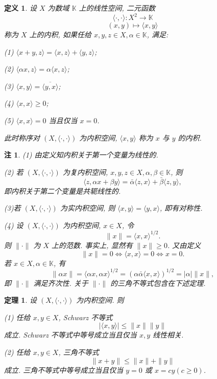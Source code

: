 \documentclass[openany]{ctexbook}
\theoremstyle{kaiti}
\newtheorem{definition}{定义}[section]
\newtheorem{theorem}{定理}[section]
\theoremstyle{normal}
\newtheorem{remark}{注}[section]
\begin{document}
\begin{definition}
设 $X$ 为数域 $\mathbb{K}$ 上的线性空间, 二元函数
$$
\langle\cdot, \cdot\rangle: X^2 \rightarrow \mathbb{K}
$$
$$
(x, y) \mapsto\langle x, y\rangle
$$
称为 $X$ 上的内积, 如果任给 $x, y, z \in X, \alpha \in \mathbb{K}$, 满足:

(1) $\langle x+y, z\rangle=\langle x, z\rangle+\langle y, z\rangle$;

(2) $\langle\alpha x, z\rangle=\alpha\langle x, z\rangle$;

(3) $\langle x, y\rangle=\overline{\langle y, x\rangle}$;

(4) $\langle x, x\rangle \geqslant 0$;

(5) $\langle x, x\rangle=0$ 当且仅当 $x=0$.

此时称序对 $(X,\langle\cdot, \cdot\rangle)$ 为内积空间, $\langle x, y\rangle$ 称为 $x$ 与 $y$ 的内积.
\end{definition}

\begin{remark}
(1) 由定义知内积关于第一个变量为线性的.

(2) 若 $(X,\langle\cdot, \cdot\rangle)$ 为复内积空间, $x, y, z \in X, \alpha, \beta \in \mathbb{K}$, 则
$$
\langle z, \alpha x+\beta y\rangle=\bar{\alpha}\langle z, x\rangle+\bar{\beta}\langle z, y\rangle,
$$
即内积关于第二个变量是共轭线性的.

(3)若 $(X,\langle\cdot, \cdot\rangle)$ 为实内积空间, 则 $\langle x, y\rangle=\langle y, x\rangle$, 即有对称性.

(4) 设 $(X,\langle\cdot, \cdot\rangle)$ 为内积空间, $x \in X$, 令
\begin{equation}
  \|x\|=\langle x, x\rangle^{1/2}.
\end{equation}
则 $\|\cdot\|$ 为 $X$ 上的范数. 事实上, 显然有 $\|x\| \geqslant 0$. 又由定义
$$
\|x\|=0 \Leftrightarrow\langle x, x\rangle=0 \Leftrightarrow x=0.
$$
若 $x \in X, \alpha \in \mathbb{K}$, 有
$$
\|\alpha x\|=\langle\alpha x, \alpha x\rangle^{1 / 2}=(\alpha \bar{\alpha}\langle x, x\rangle)^{1 / 2}=|\alpha|\|x\|,
$$
即 $\|\cdot\|$ 满足齐次性. 关于 $\|\cdot\|$ 的三角不等式包含在下述定理.
\end{remark}

\begin{theorem}
设 $(X,\langle\cdot, \cdot\rangle)$ 为内积空间. 则

(1) 任给 $x, y \in X$, Schwarz 不等式
\begin{equation}
  |\langle x, y\rangle| \leqslant\|x\|\|y\|
\end{equation}
成立. Schwarz 不等式中等号成立当且仅当 $x, y$ 线性相关.

(2) 任给 $x, y \in X$, 三角不等式
$$
\|x+y\| \leqslant\|x\|+\|y\|
$$
成立. 三角不等式中等号成立当且仅当 $y=0$ 或 $x=c y(c \geqslant 0)$.
\end{theorem}
\end{document}
